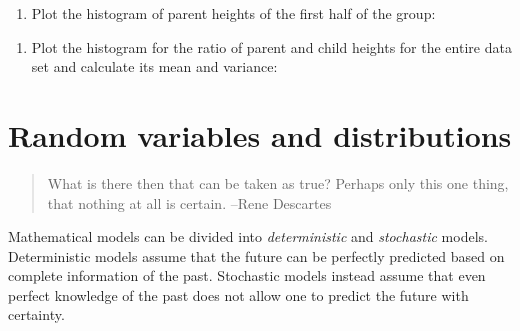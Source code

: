 \documentclass[
  letterpaper,
  DIV=11,
  numbers=noendperiod]{scrreprt}
\newenvironment{Shaded}{\begin{snugshade}}{\end{snugshade}}
\newcommand{\DecValTok}[1]{\textcolor[rgb]{0.68,0.00,0.00}{#1}}
\newcommand{\FunctionTok}[1]{\textcolor[rgb]{0.28,0.35,0.67}{#1}}
\newcommand{\NormalTok}[1]{\textcolor[rgb]{0.00,0.23,0.31}{#1}}
\newcommand{\SpecialCharTok}[1]{\textcolor[rgb]{0.37,0.37,0.37}{#1}}
\providecommand{\tightlist}{%
  \setlength{\itemsep}{0pt}\setlength{\parskip}{0pt}}\usepackage{longtable,booktabs,array}
\begin{document}
\begin{enumerate}
\def\labelenumi{\arabic{enumi}.}
\setcounter{enumi}{4}
\tightlist
\item
  Plot the histogram of parent heights of the first half of the group:
\end{enumerate}

\begin{Shaded}
\end{Shaded}

\begin{enumerate}
\def\labelenumi{\arabic{enumi}.}
\setcounter{enumi}{5}
\tightlist
\item
  Plot the histogram for the ratio of parent and child heights for the
  entire data set and calculate its mean and variance:
\end{enumerate}

\begin{Shaded}
\end{Shaded}


\hypertarget{random-variables-and-distributions}{%
\chapter{Random variables and
distributions}\label{random-variables-and-distributions}}

\begin{quote}
What is there then that can be taken as true? Perhaps only this one
thing, that nothing at all is certain. --Rene Descartes
\end{quote}

Mathematical models can be divided into \emph{deterministic} and
\emph{stochastic} models. Deterministic models assume that the future
can be perfectly predicted based on complete information of the past.
Stochastic models instead assume that even perfect knowledge of the past
does not allow one to predict the future with certainty.
\end{document}
